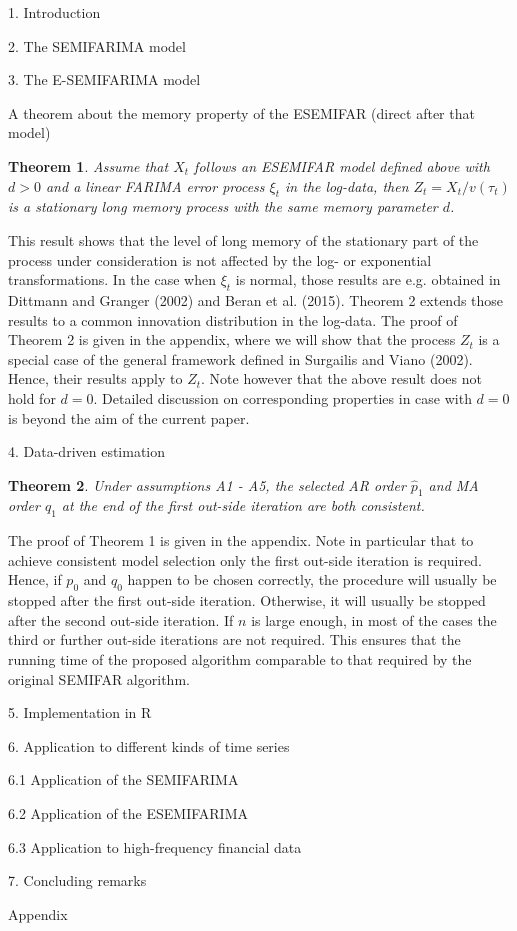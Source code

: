 \documentclass[12pt]{article}
\newtheorem{theorem}{Theorem}
\begin{document}

1. Introduction

2. The SEMIFARIMA model



3. The E-SEMIFARIMA model




A theorem about the memory property of the ESEMIFAR (direct after that model) 
\begin{theorem}
Assume that $X_t$ follows an ESEMIFAR model defined above with $d>0$ and a linear FARIMA error process $\xi_t$ in the log-data, then $Z_t=X_t/v(\tau_t)$ is a stationary long memory process with the same memory parameter $d$.   
\end{theorem}
This result shows that the level of long memory of the stationary part of the process under consideration is not affected by the log- or exponential transformations. In the case when $\xi_t$ is normal, those results are e.g. obtained in Dittmann and Granger (2002) and Beran et al. (2015). Theorem 2 extends those results to a common innovation distribution in the log-data. The proof of Theorem 2 is given in the appendix, where we will show that the process $Z_t$ is a special case of the general framework defined in Surgailis and Viano (2002). Hence, their results apply to $Z_t$. Note however that the above result does not hold for $d=0$. Detailed discussion on corresponding properties in case with $d=0$ is beyond the aim of the current paper.  



4. Data-driven estimation

\begin{theorem}
Under assumptions A1 - A5, the selected AR order $\hat p_1$ and MA order $\hat q_1$ at the end of the first out-side iteration are both consistent.
\end{theorem}
The proof of Theorem 1 is given in the appendix. Note in particular that to achieve consistent model selection only the first out-side iteration is required. Hence, if $p_0$ and $q_0$ happen to be chosen correctly, the procedure will usually be stopped after the first out-side iteration. Otherwise, it will usually be stopped after the second out-side iteration. If $n$ is large enough, in most of the cases the third or further out-side iterations are not required. This ensures that the running time of the proposed algorithm comparable to that required by the original SEMIFAR algorithm.      

5. Implementation in R

6. Application to different kinds of time series


6.1 Application of the SEMIFARIMA

6.2 Application of the ESEMIFARIMA

6.3 Application to high-frequency financial data

7. Concluding remarks

Appendix
\end{document}
